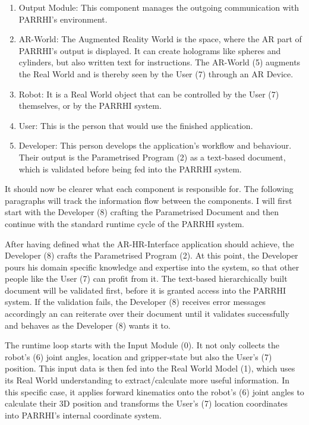 \begin{enumerate}
	\item Output Module: This component manages the outgoing communication with PARRHI's environment. 
	\item AR-World: The Augmented Reality World is the space, where the AR part of PARRHI's output is displayed. It can create holograms like spheres and cylinders, but also written text for instructions. The AR-World (5) augments the Real World and is thereby seen by the User (7) through an AR Device.
	\item Robot: It is a Real World object that can be controlled by the User (7) themselves, or by the PARRHI system.
	\item User: This is the person that would use the finished application.
	\item Developer: This person develops the application's workflow and behaviour. Their output is the Parametrised Program (2) as a text-based document, which is validated before being fed into the PARRHI system.
\end{enumerate}

It should now be clearer what each component is responsible for. The following paragraphs will track the information flow between the components. I will first start with the Developer (8) crafting the Parametrised Document and then continue with the standard runtime cycle of the PARRHI system.

After having defined what the AR-HR-Interface application should achieve, the Developer (8) crafts the Parametrised Program (2). At this point, the Developer pours his domain specific knowledge and expertise into the system, so that other people like the User (7) can profit from it. The text-based hierarchically built document will be validated first, before it is granted access into the PARRHI system. If the validation fails, the Developer (8) receives error messages accordingly an can reiterate over their document until it validates successfully and behaves as the Developer (8) wants it to.

The runtime loop starts with the Input Module (0). It not only collects the robot's (6) joint angles, location and gripper-state but also the User's (7) position. This input data is then fed into the Real World Model (1), which uses its Real World understanding to extract/calculate more useful information. In this specific case, it applies forward kinematics onto the robot's (6) joint angles to calculate their 3D position and transforms the User's (7) location coordinates into PARRHI's internal coordinate system. 


